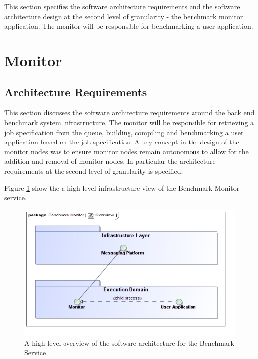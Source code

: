 This section specifies the software architecture requirements and the software
architecture design at the second level of granularity - the benchmark monitor
application. The monitor will be responsible for benchmarking a user application.

\section{Monitor}
\subsection{Architecture Requirements}
This section discusses the software architecture requirements around the
back end benchmark system infrastructure. The monitor will be responsible for
retrieving a job specification from the queue, building, compiling and
benchmarking a user application based on the job specification. A key concept
in the design of the monitor nodes was to ensure monitor nodes remain autonomous
to allow for the addition and removal of monitor nodes.
In particular the architecture requirements at the second level of
granularity is specified.

Figure \ref{fig:benchmarkInfrastructure} show the a high-level infrastructure
view of the Benchmark Monitor service.

\begin{figure}[H]
  \begin{center}
  \includegraphics[scale=0.4]{../Diagrams and Charts/Overview/BenchmarkInfrastructure.jpg}
  \caption{A high-level overview of the software architecture for the Benchmark Service}
  \label{fig:benchmarkInfrastructure}
  \end{center}
\end{figure}


